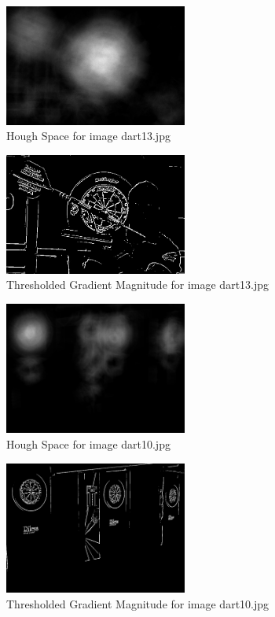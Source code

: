 \documentclass[conference]{IEEEtran}
\begin{document}
\begin{figure}[ht!]
	\centering
	\includegraphics[width=60mm]{img/Hough_Space_and_Threshold/houghspace.jpg}
	\caption{Hough Space for image dart13.jpg \label{img_dart_1}}
\end{figure}

\begin{figure}[ht!]
	\centering
	\includegraphics[width=60mm]{img/Hough_Space_and_Threshold/threshold.jpg}
	\caption{Thresholded Gradient Magnitude for image dart13.jpg \label{img_dart_1}}
\end{figure}

\begin{figure}[ht!]
	\centering
	\includegraphics[width=60mm]{img/Hough_Space_and_Threshold/houghspace2.jpg}
	\caption{Hough Space for image dart10.jpg \label{img_dart_1}}
\end{figure}

\begin{figure}[ht!]
	\centering
	\includegraphics[width=60mm]{img/Hough_Space_and_Threshold/threshold2.jpg}
	\caption{Thresholded Gradient Magnitude for image dart10.jpg \label{img_dart_1}}
\end{figure}
\end{document}
